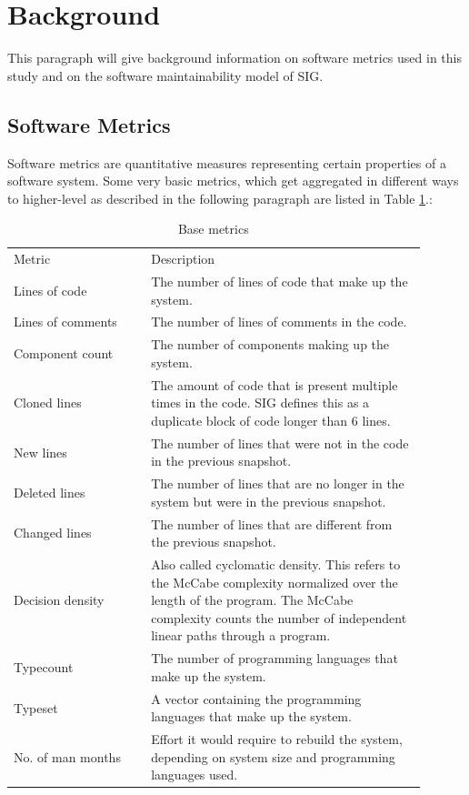 \section{Background}
\label{sec:background}
This paragraph will give background information on software metrics used in this study and on the software maintainability model of SIG.

\subsection{Software Metrics}
Software metrics are quantitative measures representing certain properties of a software system. Some very basic metrics, which get aggregated in different ways to higher-level as described in the following paragraph are listed in Table \ref{tab:base_metrics}.:
\begin{table}[htbf]
\caption{Base metrics} 
\label{tab:base_metrics}
\centering
\begin{tabular}{p{0.30\linewidth} p{0.60\linewidth}}\\
Metric   &  Description\\ 
Lines of code 		&  The number of lines of code that make up the system. \\ 
Lines of comments 	&  The number of lines of comments in the code. \\
Component count		&  The number of components making up the system. \\
Cloned lines 		&  The amount of code that is present multiple times in the code. SIG defines this as a duplicate block of code longer than 6 lines. \\ 
New lines 			&   The number of lines that were not in the code in the previous snapshot.   \\
Deleted lines 		&   The number of lines that are no longer in the system but were in the previous snapshot.  \\ 
Changed lines 		&   The number of lines that are different from the previous snapshot.   \\  
Decision density 	&   Also called cyclomatic density. This refers to the McCabe complexity normalized over the length of the program. The McCabe complexity counts the number of independent linear paths through a program. \\ 
Typecount 			&   The number of programming languages that make up the system. \\
Typeset 			&   A vector containing the programming languages that make up the system. \\
No. of man months 	&   Effort it would require to rebuild the system, depending on system size and programming languages used. \\
\end{tabular}
\end{table}

